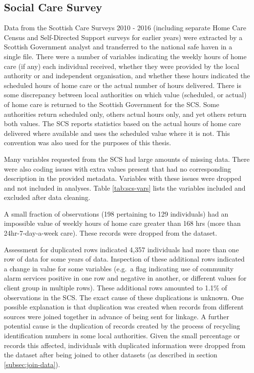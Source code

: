 \documentclass[]{article}
\begin{document}
\FloatBarrier

\subsection{Social Care Survey}\label{subsubsec:scs-summs}

Data from the Scottish Care Surveys 2010 - 2016 (including separate Home
Care Census and Self-Directed Support surveys for earlier years) were
extracted by a Scottish Government analyst and transferred to the
national safe haven in a single file. There were a number of variables
indicating the weekly hours of home care (if any) each individual
received, whether they were provided by the local authority or and
independent organisation, and whether these hours indicated the
scheduled hours of home care or the actual number of hours delivered.
There is some discrepancy between local authorities on which value
(scheduled, or actual) of home care is returned to the Scottish
Government for the SCS. Some authorities return scheduled only, others
actual hours only, and yet others return both values. The SCS reports
statistics based on the actual hours of home care delivered where
available and uses the scheduled value where it is not. This convention
was also used for the purposes of this thesis.

Many variables requested from the SCS had large amounts of missing data.
There were also coding issues with extra values present that had no
corresponding description in the provided metadata. Variables with these
issues were dropped and not included in analyses. Table
\ref{tab:scs-vars} lists the variables included and excluded after data
cleaning.

A small fraction of observations (198 pertaining to 129 individuals) had
an impossible value of weekly hours of home care greater than 168 hrs
(more than 24hr-7-day-a-week care). These records were dropped from the
dataset.

Assessment for duplicated rows indicated 4,357 individuals had more than
one row of data for some years of data. Inspection of these additional
rows indicated a change in value for some variables (e.g.~a flag
indicating use of community alarm services positive in one row and
negative in another, or different values for client group in multiple
rows). These additional rows amounted to 1.1\% of observations in the
SCS. The exact cause of these duplications is unknown. One possible
explanation is that duplication was created when records from different
sources were joined together in advance of being sent for linkage. A
further potential cause is the duplication of records created by the
process of recycling identification numbers in some local authorities.
Given the small percentage or records this affected, individuals with
duplicated information were dropped from the dataset after being joined
to other datasets (as described in section \ref{subsec:join-data}).
\end{document}
